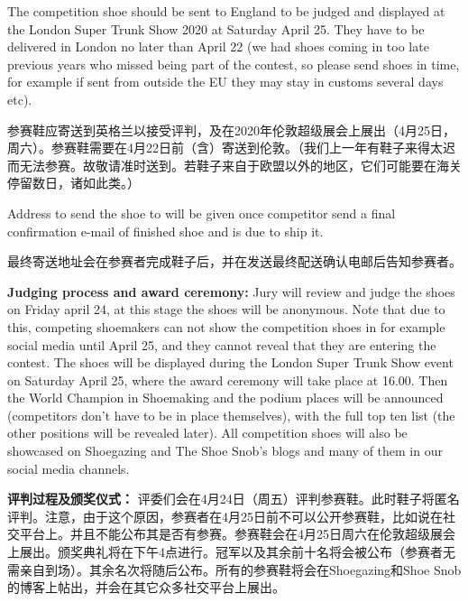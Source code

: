 \begin{paracol}{2}
        The competition shoe should be sent to England to be judged and displayed at the London Super Trunk Show 2020 at Saturday April 25. They have to be delivered in London no later than April 22 (we had shoes coming in too late previous years who missed being part of the contest, so please send shoes in time, for example if sent from outside the EU they may stay in customs several days etc).

        \switchcolumn
        参赛鞋应寄送到英格兰以接受评判，及在2020年伦敦超级展会上展出（4月25日，周六）。参赛鞋需要在4月22日前（含）寄送到伦敦。（我们上一年有鞋子来得太迟而无法参赛。故敬请准时送到。若鞋子来自于欧盟以外的地区，它们可能要在海关停留数日，诸如此类。）
        \switchcolumn*

        Address to send the shoe to will be given once competitor send a final confirmation e-mail of finished shoe and is due to ship it.

        \vspace{1em}

        \switchcolumn
        最终寄送地址会在参赛者完成鞋子后，并在发送最终配送确认电邮后告知参赛者。
        \switchcolumn*

        \textbf{Judging process and award ceremony:}
        Jury will review and judge the shoes on Friday april 24, at this stage the shoes will be anonymous. Note that due to this, competing shoemakers can not show the competition shoes in for example social media until April 25, and they cannot reveal that they are entering the contest. The shoes will be displayed during the London Super Trunk Show event on Saturday April 25, where the award ceremony will take place at 16.00. Then the World Champion in Shoemaking and the podium places will be announced (competitors don't have to be in place themselves), with the full top ten list (the other positions will be revealed later). All competition shoes will also be showcased on Shoegazing and The Shoe Snob’s blogs and many of them in our social media channels.

        \vspace{1em}

        \switchcolumn
        \textbf{评判过程及颁奖仪式：}
        评委们会在4月24日（周五）评判参赛鞋。此时鞋子将匿名评判。注意，由于这个原因，参赛者在4月25日前不可以公开参赛鞋，比如说在社交平台上。并且不能公布其是否有参赛。参赛鞋会在4月25日周六在伦敦超级展会上展出。颁奖典礼将在下午4点进行。冠军以及其余前十名将会被公布（参赛者无需亲自到场）。其余名次将随后公布。所有的参赛鞋将会在Shoegazing和Shoe Snob的博客上帖出，并会在其它众多社交平台上展出。
        \switchcolumn*


\end{paracol}
